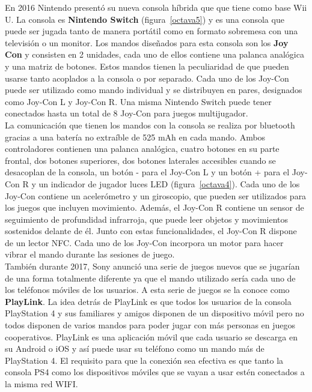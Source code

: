 En 2016 Nintendo present\'o su nueva consola h\'ibrida que que tiene como base Wii U. La consola es \textbf{Nintendo Switch} (figura~\ref{octava5}) y es una consola que puede ser jugada tanto de manera port\'atil como en formato sobremesa con una televisi\'on o un monitor. Los mandos dise\~nados para esta consola son los \textbf{Joy Con} y consisten en 2 unidades, cada uno de ellos contiene una palanca anal\'ogica y una matriz de botones. Estos mandos tienen la peculiaridad de que pueden usarse tanto acoplados a la consola o por separado. Cada uno de los Joy-Con puede ser utilizado como mando individual y se distribuyen en pares, designados como Joy-Con L y Joy-Con R. Una misma Nintendo Switch puede tener conectados hasta un total de 8 Joy-Con para juegos multijugador.\\

La comunicaci\'on que tienen los mandos con la consola se realiza por bluetooth gracias a una bater\'ia no extra\'ible de 525 mAh en cada mando. Ambos controladores contienen una palanca anal\'ogica, cuatro botones en su parte frontal, dos botones superiores, dos botones laterales accesibles cuando se desacoplan de la consola, un bot\'on - para el Joy-Con L y un bot\'on + para el Joy-Con R y un indicador de jugador luces LED (figura~\ref{octava4}). Cada uno de los Joy-Con contiene un aceler\'ometro y un giroscopio, que pueden ser utilizados para los juegos que incluyen movimiento. Adem\'as, el Joy-Con R contiene un sensor de seguimiento de profundidad infrarroja, que puede leer objetos y movimientos sostenidos delante de \'el. Junto con estas funcionalidades, el Joy-Con R dispone de un lector NFC. Cada uno de los Joy-Con incorpora un motor para hacer vibrar el mando durante las sesiones de juego.\\

Tambi\'en durante 2017, Sony anunci\'o una serie de juegos nuevos que se jugar\'ian de una forma totalmente diferente ya que el mando utilizado ser\'ia cada uno de los tel\'efonos m\'oviles de los usuarios. A esta serie de juegos se la conoce como \textbf{PlayLink}. La idea detr\'as de PlayLink es que todos los usuarios de la consola PlayStation 4 y sus familiares y amigos disponen de un dispositivo m\'ovil pero no todos disponen de varios mandos para poder jugar con m\'as personas en juegos cooperativos. PlayLink es una aplicaci\'on m\'ovil que cada usuario se descarga en su Android o iOS y as\'i puede usar su tel\'efono como un mando m\'as de PlayStation 4. El requisito para que la conexi\'on sea efectiva es que tanto la consola PS4 como los dispositivos m\'oviles que se vayan a usar est\'en conectados a la misma red WIFI.\\

